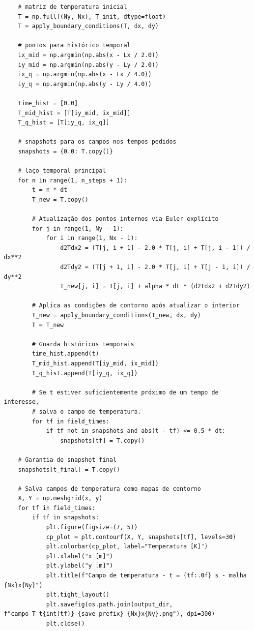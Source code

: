 \documentclass[12pt,a4paper]{article}
\begin{document}
\begin{lstlisting}
    # matriz de temperatura inicial
    T = np.full((Ny, Nx), T_init, dtype=float)
    T = apply_boundary_conditions(T, dx, dy)

    # pontos para histórico temporal
    ix_mid = np.argmin(np.abs(x - Lx / 2.0))
    iy_mid = np.argmin(np.abs(y - Ly / 2.0))
    ix_q = np.argmin(np.abs(x - Lx / 4.0))
    iy_q = np.argmin(np.abs(y - Ly / 4.0))

    time_hist = [0.0]
    T_mid_hist = [T[iy_mid, ix_mid]]
    T_q_hist = [T[iy_q, ix_q]]

    # snapshots para os campos nos tempos pedidos
    snapshots = {0.0: T.copy()}

    # laço temporal principal
    for n in range(1, n_steps + 1):
        t = n * dt
        T_new = T.copy()

        # Atualização dos pontos internos via Euler explícito
        for j in range(1, Ny - 1):
            for i in range(1, Nx - 1):
                d2Tdx2 = (T[j, i + 1] - 2.0 * T[j, i] + T[j, i - 1]) / dx**2
                d2Tdy2 = (T[j + 1, i] - 2.0 * T[j, i] + T[j - 1, i]) / dy**2
                T_new[j, i] = T[j, i] + alpha * dt * (d2Tdx2 + d2Tdy2)

        # Aplica as condições de contorno após atualizar o interior
        T_new = apply_boundary_conditions(T_new, dx, dy)
        T = T_new

        # Guarda históricos temporais
        time_hist.append(t)
        T_mid_hist.append(T[iy_mid, ix_mid])
        T_q_hist.append(T[iy_q, ix_q])

        # Se t estiver suficientemente próximo de um tempo de interesse,
        # salva o campo de temperatura.
        for tf in field_times:
            if tf not in snapshots and abs(t - tf) <= 0.5 * dt:
                snapshots[tf] = T.copy()

    # Garantia de snapshot final
    snapshots[t_final] = T.copy()

    # Salva campos de temperatura como mapas de contorno
    X, Y = np.meshgrid(x, y)
    for tf in field_times:
        if tf in snapshots:
            plt.figure(figsize=(7, 5))
            cp_plot = plt.contourf(X, Y, snapshots[tf], levels=30)
            plt.colorbar(cp_plot, label="Temperatura [K]")
            plt.xlabel("x [m]")
            plt.ylabel("y [m]")
            plt.title(f"Campo de temperatura - t = {tf:.0f} s - malha {Nx}x{Ny}")
            plt.tight_layout()
            plt.savefig(os.path.join(output_dir, f"campo_T_t{int(tf)}_{save_prefix}_{Nx}x{Ny}.png"), dpi=300)
            plt.close()


\end{lstlisting}
\end{document}
